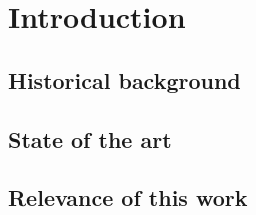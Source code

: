 \chapter{ Introduction} \label{chap:intro}
 
\section{Historical background}
\section{State of the art}
\section{Relevance of this work}
 
